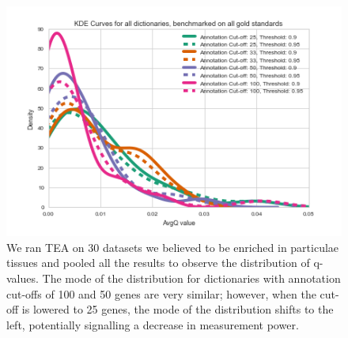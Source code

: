 \documentclass{bmcart}
\begin{document}
\begin{backmatter}
\begin{figure}[h!]
	\includegraphics[width=\textwidth]{avgQKDE_method=any.png}
  \captionsetup{width= 0.95\textwidth}
  \caption{
      We ran TEA on 30 datasets we believed to be enriched in particulae tissues and pooled all the results to observe the distribution of q-values. The mode of the distribution for dictionaries with annotation cut-offs of 100 and 50 genes are very similar; however, when the cut-off is lowered to 25 genes, the mode of the distribution shifts to the left, potentially signalling a decrease in measurement power.}
	  \label{fig:qvals}
\end{figure}


\end{backmatter}
\end{document}
